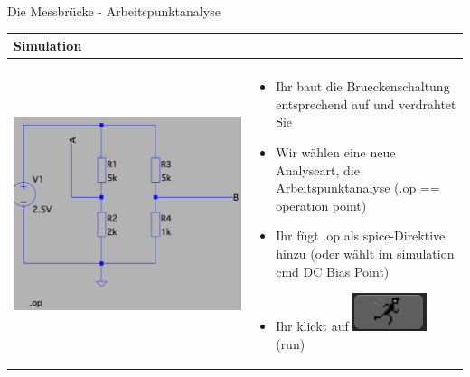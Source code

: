 \begin{frame}[t]{Die Messbrücke - Arbeitspunktanalyse}

  \begin{spacing}{0.9} \begin{tiny}
      \begin{table}[h!]
        \begin{tabular}{p{3cm} p{7cm}}
          \hline
          \textbf{Simulation}           & \\
          \hline                          \\
          \begin{minipage}{.3\textwidth}
            \includegraphics[width=\linewidth]{pictures/bridge_op_2.png}
          \end{minipage}
                                        &
          \begin{minipage}{.7\textwidth}
            \begin{itemize}
              \item Ihr baut die Brueckenschaltung entsprechend auf und verdrahtet Sie
              \item Wir wählen eine neue Analyseart, die Arbeitspunktanalyse \newline(.op == operation point)
              \item Ihr fügt .op als spice-Direktive hinzu \newline(oder wählt im simulation cmd DC Bias Point)
              \item Ihr klickt auf \includegraphics[scale=0.3]{pictures/run.png} (run)

\end{itemize}
\end{minipage}
\end{tabular}
\end{table}
\end{tiny}
\end{spacing}
\end{frame}
